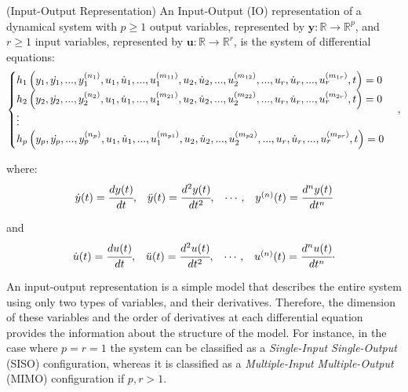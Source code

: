 \documentclass[a4paper,11pt]{book}
\numberwithin{figure}{chapter}
\numberwithin{equation}{chapter}
\numberwithin{table}{chapter}
\theoremstyle{definition}
\newtheorem{definition}{Definition}[chapter]
\newcounter{boxed-theorem}
\newcounter{boxed-definition}
\newenvironment{boxed-definition}[1]
{\begin{shaded} \begin{definition}{#1}}
{\end{definition} \end{shaded}}
\begin{document}
\begin{boxed-definition}{(Input-Output Representation)} \label{def:IORepr01}
    An Input-Output (IO) representation of a dynamical system with $p \geq 1$ output variables, represented by $\bm{y} : \mathbb{R} \rightarrow \mathbb{R}^{p}$, and $r \geq 1$ input variables, represented by $\bm{u} : \mathbb{R} \rightarrow \mathbb{R}^{r}$, is the system of differential equations:
    \begin{equation} \label{eq:IERepr01}
    \begin{cases}
        h_1 \left( y_1, \dot{y_1}, ..., y_1^{(n_1)}, u_1, \dot{u}_1, ..., u^{(m_{11})}_1, u_2, \dot{u}_2, ..., u^{(m_{12})}_2, ..., u_r, \dot{u}_r, ..., u^{(m_{1r})}_r, t   \right) = 0 & \\
        h_2 \left( y_2, \dot{y_2}, ..., y_2^{(n_2)}, u_1, \dot{u}_1, ..., u^{(m_{21})}_1, u_2, \dot{u}_2, ..., u^{(m_{22})}_2, ..., u_r, \dot{u}_r, ..., u^{(m_{2r})}_r, t   \right) = 0 & \\
         \vdots \hfill & \\
        h_p \left( y_p, \dot{y_p}, ..., y_p^{(n_p)}, u_1, \dot{u}_1, ..., u^{(m_{p1})}_1, u_2, \dot{u}_2, ..., u^{(m_{p2})}_2, ..., u_r, \dot{u}_r, ..., u^{(m_{pr})}_r, t   \right) = 0 &
    \end{cases}
    ,\end{equation}
    
    \noindent where:
    \begin{equation*}
    \begin{matrix}
        \dot{y}(t) = \cfrac{d y(t)}{dt}, & \ddot{y}(t) = \cfrac{d^2 y(t)}{dt^2}, & \cdots, & y^{(n)}(t) = \cfrac{d^n y(t)}{dt^n}
    \end{matrix}
    \end{equation*}

	\noindent and    
    \begin{equation*}
    \begin{matrix}
        \dot{u}(t) = \cfrac{d u(t)}{dt}, & \ddot{u}(t) = \cfrac{d^2 u(t)}{dt^2}, & \cdots, & u^{(n)}(t) = \cfrac{d^n u(t)}{dt^n}
    \end{matrix}
    .\end{equation*}
\end{boxed-definition}

An input-output representation is a simple model that describes the entire system using only two types of variables, and their derivatives. Therefore, the dimension of these variables and the order of derivatives at each differential equation provides the information about the structure of the model. For instance, in the case where $p = r = 1$ the system can be classified as a \textit{Single-Input Single-Output} (SISO) configuration, whereas it is classified as a \textit{Multiple-Input Multiple-Output} (MIMO) configuration if $p,r > 1$. 
\end{document}
